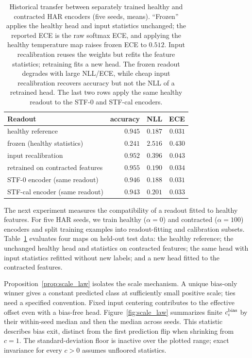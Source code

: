 \documentclass{article}
\begin{document}
\begin{table}[t]
\centering
\caption{Historical transfer between separately trained healthy and contracted HAR encoders (five seeds, means). ``Frozen'' applies the healthy head and input statistics unchanged; the reported ECE is the raw softmax ECE, and applying the healthy temperature map raises frozen ECE to $0.512$. Input recalibration reuses the weights but refits the feature statistics; retraining fits a new head. The frozen readout degrades with large NLL/ECE, while cheap input recalibration recovers accuracy but not the NLL of a retrained head. The last two rows apply the same healthy readout to the STF-0 and STF-cal encoders.}
\label{tab:readout}
\footnotesize
\begin{tabular}{lrrr}
\toprule
Readout & accuracy & NLL & ECE \\
\midrule
healthy reference & $0.945$ & $0.187$ & $0.031$ \\
frozen (healthy statistics) & $0.241$ & $2.516$ & $0.430$ \\
input recalibration & $0.952$ & $0.396$ & $0.043$ \\
retrained on contracted features & $0.955$ & $0.190$ & $0.034$ \\
STF-0 encoder (same readout) & $0.946$ & $0.188$ & $0.031$ \\
STF-cal encoder (same readout) & $0.943$ & $0.201$ & $0.033$ \\
\bottomrule
\end{tabular}
\end{table}

The next experiment measures the compatibility of a readout fitted to healthy features. For five HAR seeds, we train healthy ($\alpha=0$) and contracted ($\alpha=100$) encoders and split training examples into readout-fitting and calibration subsets. Table~\ref{tab:readout} evaluates four maps on held-out test data: the healthy reference; the unchanged healthy head and statistics on contracted features; the same head with input statistics refitted without new labels; and a new head fitted to the contracted features.

Proposition~\ref{prop:scale_law} isolates the scale mechanism. A unique bias-only winner gives a constant predicted class at sufficiently small positive scale; ties need a specified convention. Fixed input centering contributes to the effective offset even with a bias-free head. Figure~\ref{fig:scale_law} summarizes finite $c_i^{\rm bias}$ by their within-seed median and then the median across seeds. This statistic describes bias exit, distinct from the first prediction flip when shrinking from $c=1$. The standard-deviation floor is inactive over the plotted range; exact invariance for every $c>0$ assumes unfloored statistics.
\end{document}
